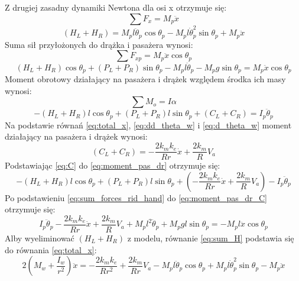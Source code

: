 Z drugiej zasadny dynamiki Newtona dla osi x otrzymuje się:
\begin{equation}
\sum F_x=M_p\ddot x
\end{equation}
\begin{equation}
(H_L+H_R)=M_pl\ddot \theta_p\cos \theta_p-M_pl\dot \theta_p^2\sin \theta_p+M_p\ddot x
\label{eq:sum_H}
\end{equation}
Suma sił przyłożonych do drążka i pasażera wynosi:
\begin{equation}
\sum F_{xp}=M_p\ddot x\cos \theta_p
\end{equation}
\begin{equation}
(H_L+H_R)\cos \theta_p+(P_L+P_R)\sin \theta_p-M_pl\ddot \theta_p-M_pg \sin \theta_p=M_p \ddot x \cos \theta_p
\label{eq:sum_forces_rid_hand}
\end{equation}
Moment obrotowy działający na pasażera i drążek względem środka ich masy wynosi:
\begin{equation}
\sum M_o=I\alpha
\end{equation}
\begin{equation}
-(H_L+H_R)l\cos \theta_p+(P_L+P_R)l\sin \theta_p+(C_L+C_R)=I_p\ddot \theta_p
\label{eq:moment_pas_dr}
\end{equation}
Na podstawie równań \eqref{eq:total_x}, \eqref{eq:dd_theta_w} i \eqref{eq:d_theta_w} moment działający na pasażera i drążek wynosi:
\begin{equation}
(C_L+C_R)=-\frac{2k_mk_e}{Rr}\dot x+\frac{2k_m}{R}V_a
\label{eq:sum_C}
\end{equation}
Podstawiając \eqref{eq:C} do \eqref{eq:moment_pas_dr} otrzymuje się:
\begin{equation}
-(H_L+H_R)l\cos \theta_p+(P_L+P_R)l\sin \theta_p+(-\frac{2k_mk_e}{Rr}\dot x+\frac{2k_m}{R}V_a)-I_p\ddot \theta_p
\label{eq:moment_pas_dr_C}
\end{equation}
Po podstawieniu \eqref{eq:sum_forces_rid_hand} do \eqref{eq:moment_pas_dr_C} otrzymuje się:
\begin{equation}
I_p\ddot \theta_p-\frac{2k_mk_e}{Rr}\dot x+\frac{2k_m}{R}V_a+M_pl^2\ddot \theta_p+M_pgl \sin \theta_p=-M_pl\ddot x\cos \theta_p
\end{equation}
Alby wyeliminować \((H_L+H_R)\) z modelu, równanie \eqref{eq:sum_H} podstawia się do równania \eqref{eq:total_x}:
\begin{equation}
2(M_w+\frac{I_w}{r^2})\ddot x=-\frac{2k_mk_e}{Rr^2}+\frac{2k_m}{Rr}V_a-M_pl\ddot \theta_p \cos \theta_p+M_pl\dot \theta_p^2\sin \theta_p-M_p\ddot x
\end{equation}
